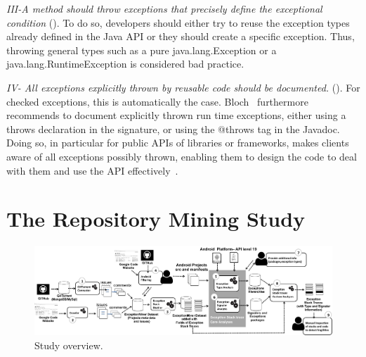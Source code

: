 \emph{III-A method should throw exceptions that precisely define the
exceptional condition} (\cite{gosling2000java,bloch2008effective}). To do so,
developers should either try to reuse the exception types already defined in the
Java API or they should create a specific exception. Thus, throwing general types such as a
pure java.lang.Exception or a java.lang.RuntimeException is considered bad practice.


\emph{IV- All exceptions explicitly thrown by reusable code should be documented.}
(\cite{mandrioli1992advances,gosling2000java,wirfs2006toward,bloch2008effective}).
For checked exceptions, this is automatically the case.
Bloch~\cite{bloch2008effective} furthermore recommends to document explicitly thrown
run time exceptions, either using a throws declaration in the signature, or using
the @throws tag in the Javadoc.
Doing so, in particular for public APIs of libraries or frameworks,
makes clients aware of all exceptions possibly thrown,
enabling them to design the code to deal with them and use the API effectively~\cite{Robil00,wirfs2006toward}.


\section{The Repository Mining Study}
\label{sec:study}

\begin{figure} 
\centering \includegraphics[width=.9\hsize]{overview_review.png}
\caption{Study overview.}\label{fig:overview} 
\end{figure}



